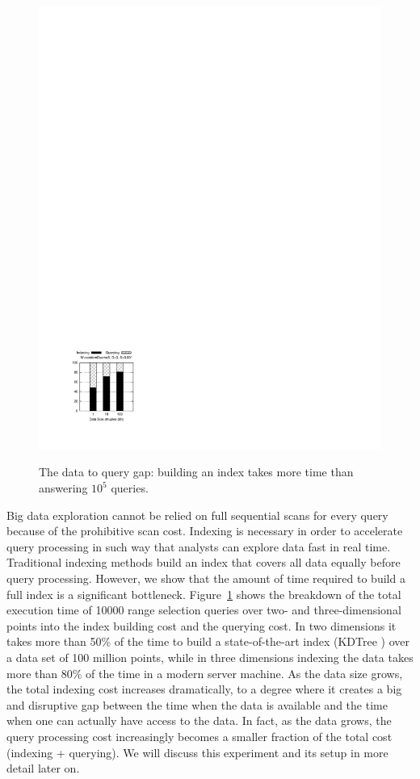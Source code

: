 \begin{figure}[t]
\begin{center}
{            \includegraphics[trim=2.5cm 2.1cm 15cm 22cm]{Figures/data_to_query_gap/graph_3_randomDsameS_1_10000}
        }%
    \caption{The data to query gap: building an index takes more time than answering $10^5$ queries.}
   \label{fig:index_build}
    \end{center}
\end{figure}

Big data exploration cannot be relied on full sequential scans for every query because of the prohibitive scan cost.
Indexing is necessary in order to accelerate query processing in such way that analysts can explore data fast in real time.
Traditional indexing methods build an index that covers all data equally before query processing.
However, we show that the amount of time required to build a full index is a significant bottleneck.
Figure~\ref{fig:index_build} shows the breakdown of the total execution time of 10000 range selection queries over two- and three-dimensional points into the index building cost and the querying cost.
In two dimensions it takes more than 50\% of the time to build a state-of-the-art index (KDTree \cite{DBLP:journals/cacm/Bentley75}) over a data set of 100 million points, while in three dimensions indexing the data takes more than 80\% of the time in a modern server machine.
As the data size grows, the total indexing cost increases dramatically, to a degree where it creates a big and disruptive gap
between the time when the data is available and the time when one can actually have access to the data.   
In fact,  as the data grows, the query processing cost increasingly becomes a smaller fraction of the total cost (indexing + querying).  
We will discuss this experiment and its setup in more detail later on.


